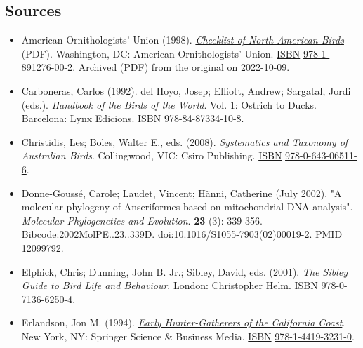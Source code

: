 \documentclass[11pt,a4paper]{article}
\begin{document}
\subsection{Sources}

\begin{itemize}
\item American Ornithologists' Union (1998). \href{https://americanornithology.org/wp-content/uploads/2019/07/AOSChecklistTin-Falcon.pdf}{\textit{Checklist of North American Birds}} (PDF). Washington, DC: American Ornithologists' Union. \href{/wiki/ISBN\_\%28identifier\%29}{ISBN} \href{/wiki/Special:BookSources/978-1-891276-00-2}{978-1-891276-00-2}. \href{https://ghostarchive.org/archive/20221009/https://americanornithology.org/wp-content/uploads/2019/07/AOSChecklistTin-Falcon.pdf}{Archived} (PDF) from the original on 2022-10-09.
\item Carboneras, Carlos (1992). del Hoyo, Josep; Elliott, Andrew; Sargatal, Jordi (eds.). \textit{Handbook of the Birds of the World}. Vol. 1: Ostrich to Ducks. Barcelona: Lynx Edicions. \href{/wiki/ISBN\_\%28identifier\%29}{ISBN} \href{/wiki/Special:BookSources/978-84-87334-10-8}{978-84-87334-10-8}.
\item Christidis, Les; Boles, Walter E., eds. (2008). \textit{Systematics and Taxonomy of Australian Birds}. Collingwood, VIC: Csiro Publishing. \href{/wiki/ISBN\_\%28identifier\%29}{ISBN} \href{/wiki/Special:BookSources/978-0-643-06511-6}{978-0-643-06511-6}.
\item Donne-Goussé, Carole; Laudet, Vincent; Hänni, Catherine (July 2002). "A molecular phylogeny of Anseriformes based on mitochondrial DNA analysis". \textit{Molecular Phylogenetics and Evolution}. \textbf{23} (3): 339-356. \href{/wiki/Bibcode\_\%28identifier\%29}{Bibcode}:\href{https://ui.adsabs.harvard.edu/abs/2002MolPE..23..339D}{2002MolPE..23..339D}. \href{/wiki/Doi\_\%28identifier\%29}{doi}:\href{https://doi.org/10.1016\%2FS1055-7903\%2802\%2900019-2}{10.1016/S1055-7903(02)00019-2}. \href{/wiki/PMID\_\%28identifier\%29}{PMID} \href{https://pubmed.ncbi.nlm.nih.gov/12099792}{12099792}.
\item Elphick, Chris; Dunning, John B. Jr.; Sibley, David, eds. (2001). \textit{The Sibley Guide to Bird Life and Behaviour}. London: Christopher Helm. \href{/wiki/ISBN\_\%28identifier\%29}{ISBN} \href{/wiki/Special:BookSources/978-0-7136-6250-4}{978-0-7136-6250-4}.
\item Erlandson, Jon M. (1994). \href{https://books.google.com/books?id=nGTaBwAAQBAJ\&pg=171}{\textit{Early Hunter-Gatherers of the California Coast}}. New York, NY: Springer Science \& Business Media. \href{/wiki/ISBN\_\%28identifier\%29}{ISBN} \href{/wiki/Special:BookSources/978-1-4419-3231-0}{978-1-4419-3231-0}.

\end{itemize}
\end{document}
